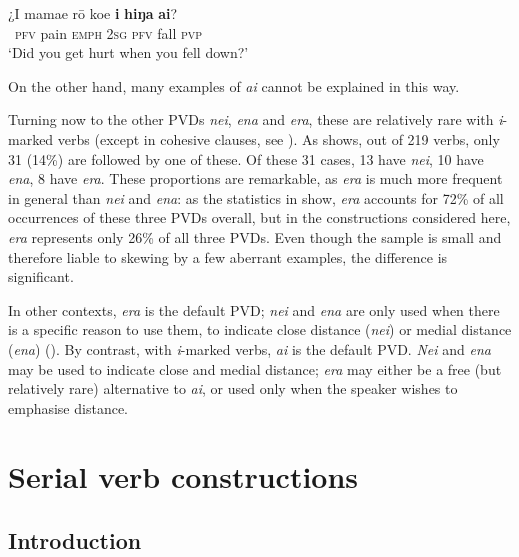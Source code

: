\ea\label{ex:7.170}
\gll ¿I mamae rō koe \textbf{i} \textbf{hiŋa} \textbf{ai}? \\
~\textsc{pfv} pain \textsc{emph} \textsc{2sg} \textsc{pfv} fall \textsc{pvp} \\

\glt
‘Did you get hurt when you fell down?’ \textstyleExampleref{[R481.131]} 
\z

On the other hand, many examples of \textit{ai} cannot be explained in this way.

Turning now to the other PVDs \textit{nei}, \textit{ena} and \textit{era}, these are relatively rare with \textit{i}{}-marked verbs (except in cohesive clauses, see ). As  shows, out of 219 verbs, only 31 (14\%) are followed by one of these. Of these 31 cases, 13 have \textit{nei}, 10 have \textit{ena}, 8 have \textit{era}. These proportions are remarkable, as \textit{era} is much more frequent in general than \textit{nei} and \textit{ena}: as the statistics in  show, \textit{era} accounts for 72\% of all occurrences of these three PVDs overall, but in the constructions considered here, \textit{era} represents only 26\% of all three PVDs. Even though the sample is small and therefore liable to skewing by a few aberrant examples, the difference is significant.

In other contexts, \textit{era} is the default PVD; \textit{nei} and \textit{ena} are only used when there is a specific reason to use them, to indicate close distance (\textit{nei}) or medial distance (\textit{ena}) (). By contrast, with \textit{i}{}-marked verbs, \textit{ai} is the default PVD. \textit{Nei} and \textit{ena} may be used to indicate close and medial distance; \textit{era} may either be a free (but relatively rare) alternative to \textit{ai}, or used only when the speaker wishes to emphasise distance. 
\section{Serial verb constructions}\label{sec:7.7}
\subsection{Introduction}\label{sec:7.7.1}

